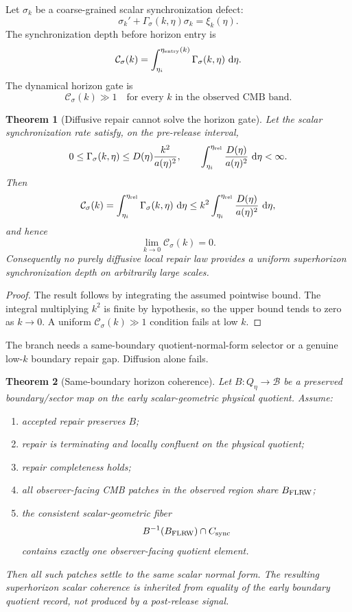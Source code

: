 \documentclass[11pt]{article}
\newtheorem{theorem}{Theorem}[section]
\newcommand{\dd}{\,\mathrm d}
\begin{document}
Let \(\sigma_k\) be a coarse-grained scalar synchronization defect:
\[
\sigma_k'+\Gamma_\sigma(k,\eta)\sigma_k=\xi_k(\eta).
\]
The synchronization depth before horizon entry is
\[
\mathcal C_\sigma(k)
=
\int_{\eta_i}^{\eta_{\rm entry}(k)}
\Gamma_\sigma(k,\eta)\,\dd\eta .
\]
The dynamical horizon gate is
\[
\boxed{
\mathcal C_\sigma(k)\gg1
\quad\text{for every }k\text{ in the observed CMB band.}
}
\]

\begin{theorem}[Diffusive repair cannot solve the horizon gate]\label{thm:diffusive-no-go}
Let the scalar synchronization rate satisfy, on the pre-release interval,
\[
0\le \Gamma_\sigma(k,\eta)
\le
D(\eta)\frac{k^2}{a(\eta)^2},
\qquad
\int_{\eta_i}^{\eta_{\rm rel}}\frac{D(\eta)}{a(\eta)^2}\,\dd\eta<\infty .
\]
Then
\[
\mathcal C_\sigma(k)
=
\int_{\eta_i}^{\eta_{\rm rel}}\Gamma_\sigma(k,\eta)\,\dd\eta
\le
k^2\int_{\eta_i}^{\eta_{\rm rel}}\frac{D(\eta)}{a(\eta)^2}\,\dd\eta,
\]
and hence
\[
\lim_{k\to0}\mathcal C_\sigma(k)=0.
\]
Consequently no purely diffusive local repair law provides a uniform superhorizon synchronization
depth on arbitrarily large scales.
\end{theorem}

\begin{proof}
The result follows by integrating the assumed pointwise bound. The integral multiplying \(k^2\) is
finite by hypothesis, so the upper bound tends to zero as \(k\to0\). A uniform
\(\mathcal C_\sigma(k)\gg1\) condition fails at low \(k\).
\end{proof}

The branch needs a same-boundary quotient-normal-form selector or a genuine low-\(k\)
boundary repair gap. Diffusion alone fails.

\begin{theorem}[Same-boundary horizon coherence]\label{thm:horizon}
Let \(B:Q_\eta\to\mathcal B\) be a preserved boundary/sector map on the early scalar-geometric
physical quotient. Assume:
\begin{enumerate}[leftmargin=2em]
\item accepted repair preserves \(B\);
\item repair is terminating and locally confluent on the physical quotient;
\item repair completeness holds;
\item all observer-facing CMB patches in the observed region share \(B_{\rm FLRW}\);
\item the consistent scalar-geometric fiber
\[
B^{-1}(B_{\rm FLRW})\cap C_{\rm sync}
\]
contains exactly one observer-facing quotient element.
\end{enumerate}
Then all such patches settle to the same scalar normal form. The resulting superhorizon scalar
coherence is inherited from equality of the early boundary quotient record, not produced by a
post-release signal.
\end{theorem}
\end{document}
